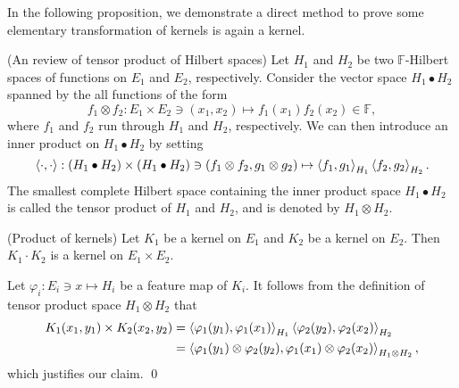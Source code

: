 \documentclass[a4paper,12pt]{article}
\begin{document}
In the following proposition, we demonstrate a direct method to prove some elementary transformation of kernels is again a kernel.
\begin{rem} (An review of tensor product of Hilbert spaces)
	Let \( H_1 \) and \( H_2 \) be two \( \mathbb{F} \)-Hilbert spaces of functions on \( E_1 \) and \( E_2 \), respectively. Consider the vector space \( H_1 \bullet H_2 \) spanned by the all functions of the form
	\begin{equation*}
		f_1 \otimes f_2: E_1 \times E_2 \ni (x_1,x_2) \mapsto f_1(x_1)f_2(x_2) \in \mathbb{F},
	\end{equation*}
	where \( f_1 \) and \( f_2 \) run through \( H_1 \) and \( H_2 \), respectively.
	We can then introduce an inner product on \( H_1 \bullet H_2 \) by setting
	\begin{equation*}
		\left<\cdot , \cdot  \right> : \left( H_1 \bullet H_2 \right) \times \left( H_1 \bullet H_2 \right) \ni (f_1 \otimes f_2, g_1 \otimes  g_2) \mapsto \left<f_1, g_1 \right>_{H_1} \left<f_2, g_2 \right>_{H_2}.
	\end{equation*}
	The smallest complete Hilbert space containing the inner product space \( H_1 \bullet H_2 \) is called the tensor product of \( H_1 \) and \( H_2 \), and is denoted by \( H_1 \otimes H_2 \).
	\fin\end{rem}
\begin{prp} (Product of kernels)
	Let \( K_1 \) be a kernel on \( E_1 \) and \( K_2 \) be a kernel on \( E_2 \). Then \( K_1 \cdot K_2 \) is a kernel on \( E_1 \times E_2 \).
\end{prp}
\begin{prf}
	Let \( \varphi_i : E_i \ni x \mapsto H_i \) be a feature map of \( K_i \). It follows from the definition of tensor product space \( H_1 \otimes H_2 \) that
	\begin{equation*}
		\begin{aligned}
			K_1(x_1,y_1) \times K_2(x_2,y_2)
			 & = \left<\varphi_1(y_1), \varphi_1(x_1) \right>_{H_1} \left<\varphi_2(y_2), \varphi_2(x_2) \right>_{H_2}                  \\
			 & = \left<\varphi_1(y_1) \otimes \varphi_2(y_2), \varphi_1(x_1) \otimes \varphi_2(x_2) \right>_{H_1 \otimes H_2},
		\end{aligned}
	\end{equation*}
	which justifies our claim.
	\qed\end{prf}
\end{document}
